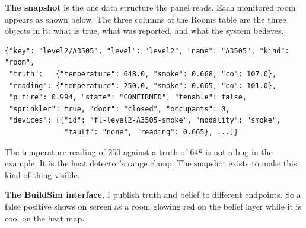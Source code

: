 \textbf{The snapshot} is the one data structure the panel reads. Each monitored room
appears as shown below. The three columns of the Rooms table are the three objects
in it: what is true, what was reported, and what the system believes.

\begin{verbatim}
{"key": "level2/A3505", "level": "level2", "name": "A3505", "kind": "room",
 "truth":   {"temperature": 648.0, "smoke": 0.668, "co": 107.0},
 "reading": {"temperature": 250.0, "smoke": 0.665, "co": 101.0},
 "p_fire": 0.994, "state": "CONFIRMED", "tenable": false,
 "sprinkler": true, "door": "closed", "occupants": 0,
 "devices": [{"id": "fl-level2-A3505-smoke", "modality": "smoke",
              "fault": "none", "reading": 0.665}, ...]}
\end{verbatim}

The temperature reading of 250 against a truth of 648 is not a bug in the example.
It is the heat detector's range clamp. The snapshot exists to make this kind of
thing visible.

\textbf{The BuildSim interface.} I publish truth and belief to different endpoints.
So a false positive shows on screen as a room glowing red on the belief layer while
it is cool on the heat map.


